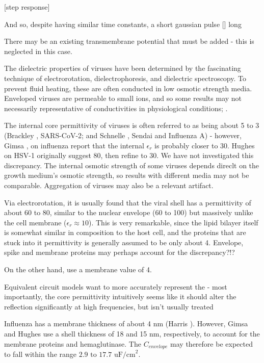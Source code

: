 \documentclass[fleqn,10pt]{paper}
\begin{document}
[step response]

And so, despite having similar time constants, a short gaussian pulse [] long 


There may be an existing transmembrane potential that must be added - this is neglected in this case.

The dielectric properties of viruses have been determined by the fascinating technique of electrorotation, dielectrophoresis, and dielectric spectroscopy. To prevent fluid heating, these are often conducted in low osmotic strength media. Enveloped viruses are permeable to small ions, and so some results may not necessarily representative of conductivities in physiological conditions; \cite{Assessment}.

The internal core permittivity of viruses is often referred to as being about 5 to 3 (Brackley \cite{Electrostatic2020}, SARS-CoV-2; and Schnelle \cite{Trapping1996}, Sendai and Influenza A) - however, Gimsa \cite{New1999}, on influenza report that the internal $\epsilon_r$ is probably closer to 30. Hughes on HSV-1 originally suggest 80\cite{Manipulation1998}, then refine to 30\cite{Dielectrophoretic2001}. We have not investigated this discrepancy. The internal osmotic strength of some viruses depends direclt on the growth medium's osmotic strength\cite{Osmotic2003}, so results with different media may not be comparable. Aggregation of viruses may also be a relevant artifact. 

Via electrorotation, it is usually found that the viral shell has a permittivity of about 60 to 80, similar to the nuclear envelope (60 to 100) but massively unlike the cell membrane ($\epsilon_r\approx 10$). This is very remarkable, since the lipid bilayer itself is somewhat similar in composition to the host cell, and the proteins that are stuck into it permittivity is generally assumed to be only about 4. Envelope, spike and membrane proteins may perhaps account for the discrepancy?!?

On the other hand, \cite{Electrostatic2020a} use a membrane value of 4.

Equivalent circuit models want to more accurately represent the - most importantly, the core permittivity intuitively seems like it should alter the reflection significantly at high frequencies, but isn't usually treated 

Influenza has a membrane thickness of about 4 nm (Harris \cite{Influenza2006}). However, Gimsa and Hughes use a shell thickness of 18 and 15 nm, respectively, to account for the membrane proteins and hemaglutinase. The $C_{envelope}$ may therefore be expected to fall within the range $2.9 \text{ to } 17.7 \text{ uF/cm}^2$.
\end{document}

